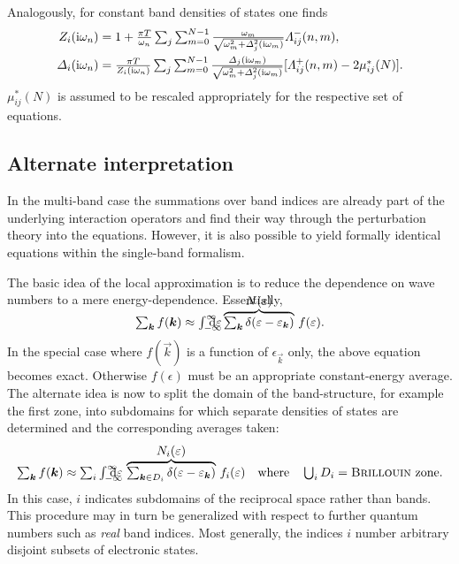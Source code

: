 Analogously, for constant band densities of states one finds
%
\begin{subequations} \label{CDOS multi-band Eliashberg equations}
    \begin{align}
        Z_i(\I \omega_n)
        &= 1 + \frac{\pi T}{\omega_n} \sum_j \sum_{m = 0}^{N - 1}
        \frac{\omega_m}{\sqrt{\omega_m^2 + \Delta_j^2(\I \omega_m)}}
        \Lambda_{i j}^-(n, m),
        \\
        \Delta_i(\I \omega_n) &= \frac{\pi T}{Z_i(\I \omega_n)}
        \sum_j \sum_{m = 0}^{N - 1}
        \frac
            {\Delta_j(\I \omega_m)}
            {\sqrt{\omega_m^2 + \Delta_j^2(\I \omega_m)}}
        [\Lambda_{i j}^+(n, m) - 2 \mu^*_{i j}(N)].
    \end{align}
\end{subequations}
%
$\mu^*_{i j}(N)$ is assumed to be rescaled appropriately for the respective set
of equations.

\subsection{Alternate interpretation}

In the multi-band case the summations over band indices are already part of the
underlying interaction  operators and find their way through the
 perturbation theory into the  equations.
However, it is also possible to yield formally identical equations within the
single-band formalism.

The basic idea of the local approximation is to reduce the dependence on wave
numbers to a mere energy-dependence. Essentially,
%
\begin{equation*}
    \sum_{\vec k} f(\vec k) \approx
    \int \from{-\infty} \till \infty \D \epsilon \,
    \smash{
        \hyper
            {\sum_{\vec k} \delta(\epsilon - \epsilon_{\vec k})}
            {N(\epsilon)} \,
        f(\epsilon)
        }.
\end{equation*}
%
In the special case where $f(\vec k)$ is a function of $\epsilon_{\vec k}$ only,
the above equation becomes exact. Otherwise $f(\epsilon)$ must be an appropriate
constant-energy average. The alternate idea is now to split the domain of the
band-structure, for example the first  zone, into subdomains for
which separate densities of states are determined \cite{Entel76} and the
corresponding averages taken:
%
\begin{equation*}
    \sum_{\vec k} f(\vec k) \approx
    \sum_i \int \from{-\infty} \till \infty \D \epsilon \,
    \hyper
        {\sum_{\vec k \in D_i} \delta(\epsilon - \epsilon_{\vec k})}
        {N_i(\epsilon)} \,
    f_i(\epsilon)
    \quad \text{where} \quad
    \bigcup_i D_i = \text{\name{Brillouin} zone}.
\end{equation*}
%
In this case, $i$ indicates subdomains of the reciprocal space rather than
bands. This procedure may in turn be generalized with respect to further quantum
numbers such as \emph{real} band indices. Most generally, the indices $i$ number
arbitrary disjoint subsets of electronic states.

